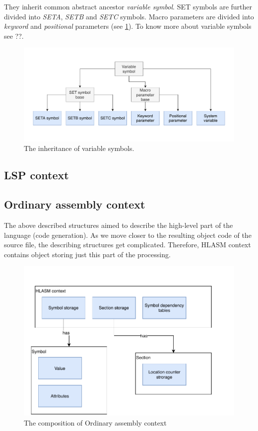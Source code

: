They inherit common abstract ancestor \emph{variable symbol}. SET symbols are further divided into \emph{SETA}, \emph{SETB} and \emph{SETC} symbols. Macro parameters are divided into \emph{keyword} and \emph{positional} parameters (see \cref{fig06:var}). To know more about variable symbols see ??. 

\begin{figure}
	\centering
	\includegraphics[width=\textwidth]{img/variable_arch}
	\caption{The inheritance of variable symbols.}
	\label{fig06:var}
\end{figure}

\subsection{LSP context}

\subsection{Ordinary assembly context}

The above described structures aimed to describe the high-level part of the language (code generation). As we move closer to the resulting object code of the source file, the describing structures get complicated. Therefore, HLASM context contains object storing just this part of the processing.

\begin{figure}
	\centering
	\includegraphics[width=\textwidth / 2]{img/ord_ctx_arch}
	\caption{The composition of Ordinary assembly context}
	\label{fig06:ord_ctx}
\end{figure}

